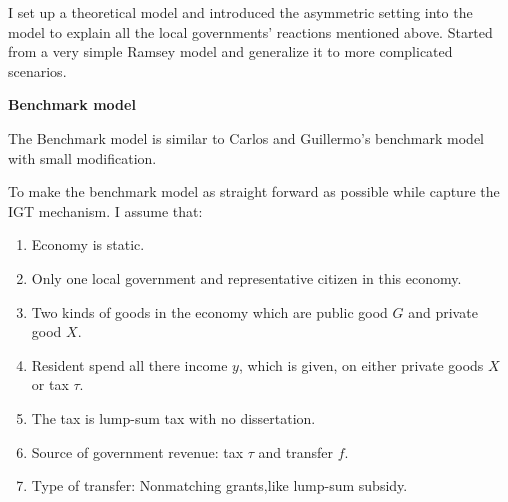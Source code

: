 I set up a theoretical model and introduced the asymmetric setting into the model to explain all the local governments' reactions mentioned above. Started from a very simple Ramsey model and generalize it to more complicated scenarios.

\textbf{Benchmark model}

The Benchmark model is similar to Carlos and Guillermo's \cite{vegh2016unsticking} benchmark model with small modification.

To make the benchmark model as straight forward as possible while capture the IGT mechanism. I assume that:

\begin{enumerate}
    \item Economy is static.
    \item Only one local government and representative citizen in this economy.
    \item Two kinds of goods in the economy which are public good $G$ \label{G} and private good $X$.\label{X}
    \item Resident spend all there income $y$, which is given, on either private goods $X$ or tax $\tau$.\label{y}
    \item The tax is lump-sum tax with no dissertation.
    \item Source of government revenue: tax $\tau$ and transfer $f$.\label{f}
    \item Type of transfer: Nonmatching grants,like lump-sum subsidy.
\end{enumerate}

